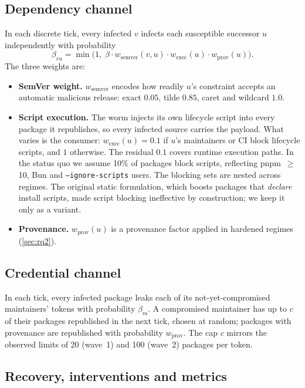\subsection{Dependency channel}
In each discrete tick, every infected $v$ infects each susceptible successor $u$ independently with
probability
\begin{equation}
  \beta_{vu} = \min\bigl(1,\; \beta \cdot w_{\text{semver}}(v,u) \cdot w_{\text{exec}}(u) \cdot w_{\text{prov}}(u)\bigr).
  \label{eq:beta}
\end{equation}
The three weights are:
\begin{itemize}
  \item \textbf{SemVer weight.} $w_{\text{semver}}$ encodes how readily $u$'s constraint accepts an
        automatic malicious release: exact $0.05$, tilde $0.85$, caret and wildcard $1.0$.
  \item \textbf{Script execution.} The worm injects its own lifecycle script into every package it
        republishes, so every infected source carries the payload. What varies is the consumer:
        $w_{\text{exec}}(u)=0.1$ if $u$'s maintainers or CI block lifecycle scripts, and $1$ otherwise.
        The residual $0.1$ covers runtime execution paths. In the status quo we assume 10\% of
        packages block scripts, reflecting pnpm~$\geq$10, Bun and \texttt{--ignore-scripts} users. The
        blocking sets are nested across regimes. The original static formulation, which boosts packages
        that \emph{declare} install scripts, made script blocking ineffective by construction; we keep
        it only as a variant.
  \item \textbf{Provenance.} $w_{\text{prov}}(u)$ is a provenance factor applied in hardened regimes
        (\cref{sec:rq2}).
\end{itemize}

\subsection{Credential channel}
In each tick, every infected package leaks each of its not-yet-compromised maintainers' tokens with
probability $\beta_m$. A compromised maintainer has up to $c$ of their packages republished in the next
tick, chosen at random; packages with provenance are republished with probability $w_{\text{prov}}$.
The cap $c$ mirrors the observed limits of 20 (wave~1) and 100 (wave~2) packages per token.

\subsection{Recovery, interventions and metrics}

